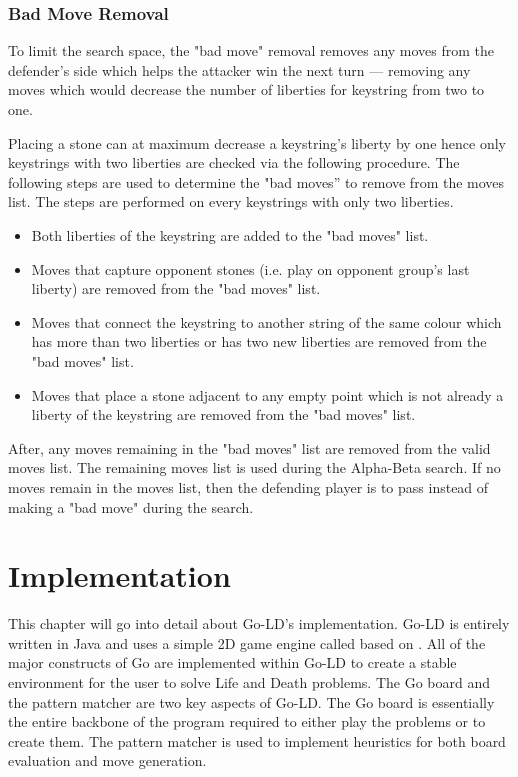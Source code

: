\documentclass{l4proj}
\begin{document}
\subsection{Bad Move Removal}
To limit the search space, the "bad move" removal removes any moves from the defender's side which helps the attacker win the next turn — removing any moves which would decrease the number of liberties for keystring from two to one.

Placing a stone can at maximum decrease a keystring's liberty by one hence only keystrings with two liberties are checked via the following procedure. The following steps are used to determine the "bad moves” to remove from the moves list. The steps are performed on every keystrings with only two liberties.

\begin{itemize}
    \item Both liberties of the keystring are added to the "bad moves" list.
    \item Moves that capture opponent stones (i.e. play on opponent group's last liberty) are removed from the "bad moves" list.
    \item Moves that connect the keystring to another string of the same colour which has more than two liberties or has two new liberties are removed from the "bad moves" list.
    \item Moves that place a stone adjacent to any empty point which is not already a liberty of the keystring are removed from the "bad moves" list.
\end{itemize}

After, any moves remaining in the "bad moves" list are removed from the valid moves list. The remaining moves list is used during the Alpha-Beta search. If no moves remain in the moves list, then the defending player is to pass instead of making a "bad move" during the search.














\chapter{Implementation}
This chapter will go into detail about Go-LD's implementation. Go-LD is entirely written in Java and uses a simple 2D game engine called  \cite{SLICK2D} based on  \cite{LWJGL}. All of the major constructs of Go are implemented within Go-LD to create a stable environment for the user to solve Life and Death problems.  The Go board and the pattern matcher are two key aspects of Go-LD. The Go board is essentially the entire backbone of the program required to either play the problems or to create them. The pattern matcher is used to implement heuristics for both board evaluation and move generation.
\end{document}
